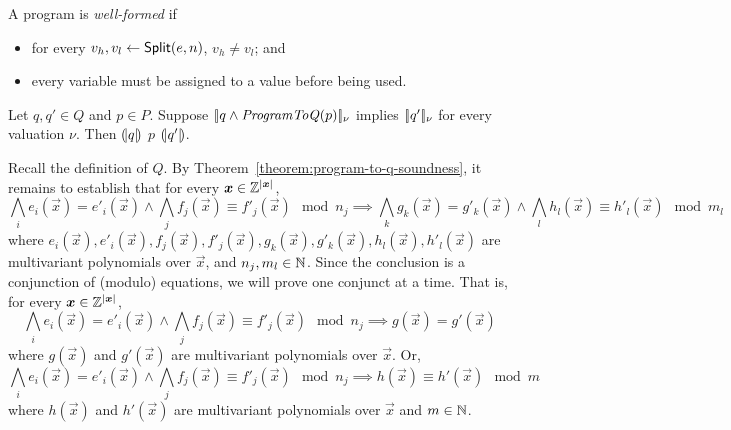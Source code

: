 \begin{definition}
  A program is \emph{well-formed} if
  \begin{itemize}
  \item for every $v_h, v_l \leftarrow \mbox{\textsf{Split}}(e, n)$, $v_h
    \neq v_l$; and
  \item every variable must be assigned to a value before being used.
  \end{itemize}
\end{definition}

\begin{theorem}
  \label{theorem:program-to-q-soundness}
  Let $q, q' \in Q$ and $p \in P$.
  Suppose $[\!|{q \wedge \textmd{\textit{ProgramToQ}}(p)}|\!]_\nu$
  implies $[\!|{q'}|\!]_\nu$ for every valuation $\nu$. 
  Then ${(\!|}{q}{|\!)}$ $p$ ${(\!|}{q'}{|\!)}$.
\end{theorem}

Recall the definition of $Q$. By
Theorem~\ref{theorem:program-to-q-soundness}, it remains to establish
that for every $\vec{x} \in \bbfZ^{|\vec{x}|}$, 
\[
  \bigwedge\limits_i e_i (\vec{x}) = e'_i (\vec{x}) \wedge
  \bigwedge\limits_j f_j (\vec{x}) \equiv f'_j (\vec{x}) \mod n_j
  \implies
  \bigwedge\limits_k g_k (\vec{x}) = g'_k (\vec{x}) \wedge
  \bigwedge\limits_l   h_l (\vec{x}) \equiv h'_l (\vec{x}) \mod m_l
\]
where
$e_i (\vec{x}), e'_i (\vec{x}), f_j (\vec{x}), f'_j (\vec{x}),
 g_k (\vec{x}), g'_k (\vec{x}), h_l (\vec{x}), h'_l (\vec{x})$
are multivariant polynomials over $\vec{x}$, and
$n_j, m_l \in \mathbb{N} $. Since the conclusion is a conjunction of
(modulo) equations, we will prove one conjunct at a time. That is, for
every $\vec{x} \in \bbfZ^{|\vec{x}|}$, 
\[
  \bigwedge\limits_i e_i (\vec{x}) = e'_i (\vec{x}) \wedge
  \bigwedge\limits_j f_j (\vec{x}) \equiv f'_j (\vec{x}) \mod n_j
  \implies
  g (\vec{x}) = g' (\vec{x})
\] where $g (\vec{x})$ and $g' (\vec{x})$ are multivariant polynomials
over $\vec{x}$. Or,
\[
  \bigwedge\limits_i e_i (\vec{x}) = e'_i (\vec{x}) \wedge
  \bigwedge\limits_j f_j (\vec{x}) \equiv f'_j (\vec{x}) \mod n_j
  \implies
  h (\vec{x}) \equiv h' (\vec{x}) \mod m
\] where $h (\vec{x})$ and $h' (\vec{x})$ are multivariant polynomials
over $\vec{x}$ and $m \in \mathbb{N}$.
